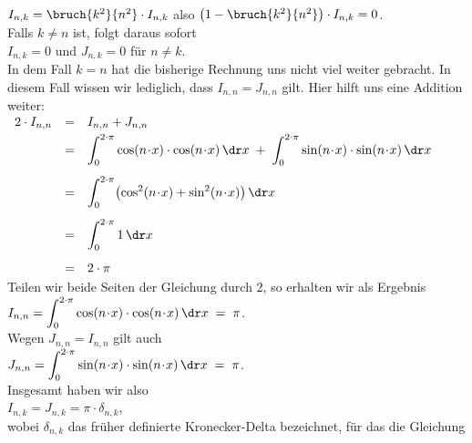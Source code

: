 \\[0.3cm]
\hspace*{1.3cm}
$I_{n,k} = \bruch{k^2}{n^2} \cdot I_{n,k}$ \quad also \quad $\left(1 - \bruch{k^2}{n^2}\right)\cdot I_{n,k} = 0$.
\\[0.3cm]
Falls $k\not=n$ ist, folgt daraus sofort 
\\[0.3cm]
\hspace*{1.3cm}
$I_{n,k} = 0$ \quad und \quad $J_{n,k} = 0$ \quad f\"ur $n\not=k$.
\\[0.3cm]
In dem Fall $k=n$ hat die bisherige Rechnung uns nicht viel weiter gebracht.  In diesem Fall wissen wir lediglich,
dass $I_{n,n} = J_{n,n}$ gilt.  Hier hilft uns eine Addition weiter:
\\[0.1cm]
\hspace*{1.3cm}
$
\begin{array}[t]{lcl}
  2 \cdot I_{n,n} & = & I_{n,n} + J_{n,n} \\[0.1cm]
              & = & \displaystyle
                    \int_0^{2\cdot\pi} \cos(n\!\cdot\!x)\cdot\cos(n\!\cdot\!x)\, \dr x \;+\;
                    \int_0^{2\cdot\pi} \sin(n\!\cdot\!x)\cdot\sin(n\!\cdot\!x)\, \dr x  \\[0.5cm]
              & = & \displaystyle
                    \int_0^{2\cdot\pi} \bigl(\cos^2(n\!\cdot\!x) + \sin^2(n\!\cdot\!x)\bigr)\, \dr x  \\[0.5cm]
              & = & \displaystyle
                    \int_0^{2\cdot\pi} 1\, \dr x  \\[0.5cm]
              & = & \displaystyle 2\cdot\pi 
\end{array}
$
\\[0.1cm]
Teilen wir beide Seiten der Gleichung durch 2, so erhalten wir als Ergebnis
\\[0.3cm]
\hspace*{1.3cm}
$I_{n,n} = \displaystyle \int_0^{2\cdot\pi} \cos(n\!\cdot\!x)\cdot\cos(n\!\cdot\!x)\, \dr x \;=\; \pi$.
\\[0.3cm] 
Wegen $J_{n,n} = I_{n,n}$ gilt auch 
\\[0.3cm]
\hspace*{1.3cm}
$J_{n,n} = \displaystyle \int_0^{2\cdot\pi} \sin(n\!\cdot\!x)\cdot\sin(n\!\cdot\!x)\, \dr x \;=\; \pi$.
\\[0.3cm] 
Insgesamt haben wir also 
\\[0.1cm]
\hspace*{1.3cm}
$I_{n,k} = J_{n,k} = \pi\cdot\delta_{n,k}$, 
\\[0.1cm]
wobei $\delta_{n,k}$ das fr\"uher definierte Kronecker-Delta bezeichnet, f\"ur das die Gleichung
